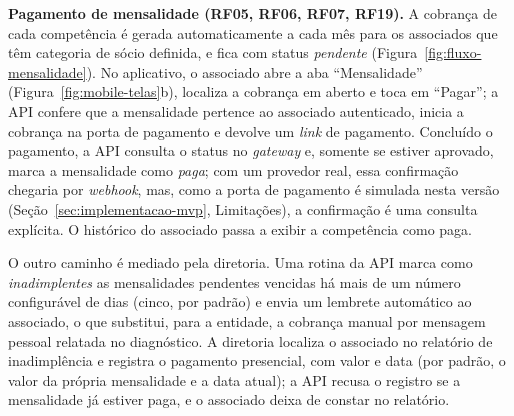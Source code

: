 \documentclass[12pt,a4paper]{article}
\begin{document}
\textbf{Pagamento de mensalidade (RF05, RF06, RF07, RF19).} A cobrança de cada competência é gerada
automaticamente a cada mês para os associados que têm categoria de sócio definida, e fica com status
\textit{pendente} (Figura~\ref{fig:fluxo-mensalidade}). No aplicativo, o associado abre a aba
``Mensalidade'' (Figura~\ref{fig:mobile-telas}b), localiza a cobrança em aberto e toca em ``Pagar''; a
API confere que a mensalidade pertence ao associado autenticado, inicia a cobrança na porta de
pagamento e devolve um \textit{link} de pagamento. Concluído o pagamento, a API consulta o status no
\textit{gateway} e, somente se estiver aprovado, marca a mensalidade como \textit{paga}; com um
provedor real, essa confirmação chegaria por \textit{webhook}, mas, como a porta de pagamento é
simulada nesta versão (Seção~\ref{sec:implementacao-mvp}, Limitações), a confirmação é uma consulta
explícita. O histórico do associado passa a exibir a competência como paga.

O outro caminho é mediado pela diretoria. Uma rotina da API marca como \textit{inadimplentes} as
mensalidades pendentes vencidas há mais de um número configurável de dias (cinco, por padrão) e envia
um lembrete automático ao associado, o que substitui, para a entidade, a cobrança manual por
mensagem pessoal relatada no diagnóstico. A diretoria localiza o associado no relatório de
inadimplência e registra o pagamento presencial, com valor e data (por padrão, o valor da própria
mensalidade e a data atual); a API recusa o registro se a mensalidade já estiver paga, e o associado
deixa de constar no relatório.
\end{document}
